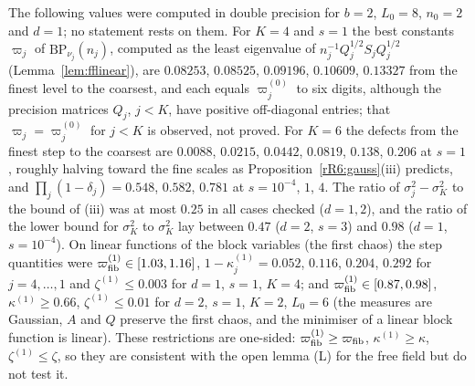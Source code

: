 \begin{remark}\label{rR6:numerics}
The following values were computed in double precision for $b=2$, $L_0=8$,
$n_0=2$ and $d=1$; no statement rests on them. For $K=4$ and $s=1$ the best
constants $\varpi_j$ of $\mathrm{BP}_{\nu_j}(n_j)$, computed as the least
eigenvalue of $n_j^{-1}Q_j^{1/2}S_jQ_j^{1/2}$ (Lemma~\ref{lem:fflinear}),
are $0.08253$, $0.08525$, $0.09196$, $0.10609$, $0.13327$ from the finest
level to the coarsest, and each equals $\varpi^{(0)}_j$ to six digits,
although the precision matrices $Q_j$, $j<K$, have positive off-diagonal
entries; that $\varpi_j=\varpi^{(0)}_j$ for $j<K$ is observed, not proved.
For $K=6$ the defects from the finest step to the coarsest are $0.0088$,
$0.0215$, $0.0442$, $0.0819$, $0.138$, $0.206$ at $s=1$, roughly halving
toward the fine scales as Proposition~\ref{rR6:gauss}(iii) predicts, and
$\prod_j(1-\delta_j)=0.548$, $0.582$, $0.781$ at $s=10^{-4}$, $1$, $4$. The
ratio of $\sigma_j^2-\sigma_K^2$ to the bound of (iii) was at most $0.25$
in all cases checked ($d=1,2$), and the ratio of the lower bound for
$\sigma_K^2$ to $\sigma_K^2$ lay between $0.47$ ($d=2$, $s=3$) and $0.98$
($d=1$, $s=10^{-4}$). On linear functions of the block variables
(the first chaos) the step quantities were $\varpi^{(1)}_{\rm fib}\in
[1.03,1.16]$, $1-\kappa^{(1)}_j=0.052$, $0.116$, $0.204$, $0.292$ for $j=4,
\dots,1$ and $\zeta^{(1)}\le0.003$ for $d=1$, $s=1$, $K=4$; and
$\varpi^{(1)}_{\rm fib}\in[0.87,0.98]$, $\kappa^{(1)}\ge0.66$,
$\zeta^{(1)}\le0.01$ for $d=2$, $s=1$, $K=2$, $L_0=6$ (the measures are
Gaussian, $A$ and $Q$ preserve the first chaos, and the minimiser of a
linear block function is linear). These restrictions are one-sided:
$\varpi^{(1)}_{\rm fib}\ge\varpi_{\rm fib}$, $\kappa^{(1)}\ge\kappa$,
$\zeta^{(1)}\le\zeta$, so they are consistent with the open lemma (L) for
the free field but do not test it.
\end{remark}

